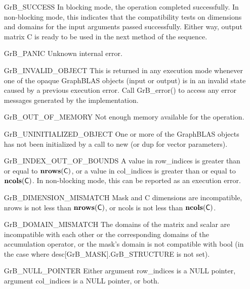 \begin{itemize}[leftmargin=2.3in]
    \item[{\sf GrB\_SUCCESS}]         In blocking mode, the operation completed
    successfully. In non-blocking mode, this indicates that the compatibility 
    tests on dimensions and domains for the input arguments passed successfully. 
    Either way, output matrix {\sf C} is ready to be used in the next method of 
    the sequence.

    \item[{\sf GrB\_PANIC}]           Unknown internal error.

    \item[{\sf GrB\_INVALID\_OBJECT}] This is returned in any execution mode 
    whenever one of the opaque GraphBLAS objects (input or output) is in an invalid 
    state caused by a previous execution error.  Call {\sf GrB\_error()} to access 
    any error messages generated by the implementation.

    \item[{\sf GrB\_OUT\_OF\_MEMORY}] Not enough memory available for the operation.

    \item[{\sf GrB\_UNINITIALIZED\_OBJECT}] One or more of the GraphBLAS objects 
    has not been initialized by a call to {\sf new} (or {\sf dup} for vector
    parameters).

    \item[{\sf GrB\_INDEX\_OUT\_OF\_BOUNDS}]  A value in {\sf row\_indices} 
    is greater than or equal to $\bold{nrows}({\sf C})$, or a value in 
    {\sf col\_indices} is greater than or equal to $\bold{ncols}({\sf C})$.  In 
    non-blocking mode, this can be reported as an execution error.

    \item[{\sf GrB\_DIMENSION\_MISMATCH}] {\sf Mask} and {\sf C}
    dimensions are incompatible, {\sf nrows} is not less than $\bold{nrows}({\sf C})$, or
    {\sf ncols} is not less than $\bold{ncols}({\sf C})$. 

    \item[{\sf GrB\_DOMAIN\_MISMATCH}]    The domains of the matrix and scalar are
    incompatible with each other or the corresponding domains of the 
    accumulation operator, or the mask's domain is not compatible with {\sf bool}
    (in the case where {\sf desc[GrB\_MASK].GrB\_STRUCTURE} is not set).

    \item[{\sf GrB\_NULL\_POINTER}] Either argument {\sf row\_indices} is a {\sf NULL} pointer,
	argument {\sf col\_indices} is a {\sf NULL} pointer, or both.
\end{itemize}

